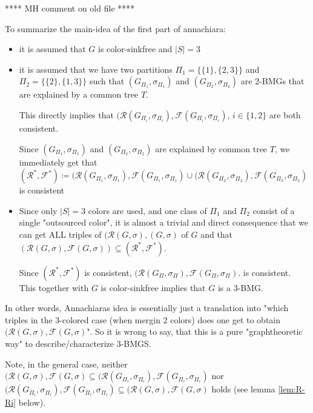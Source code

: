 \documentclass[final,3p,times]{elsarticle}
\newcommand{\TODO}[1]{\begingroup\color{red}#1\endgroup}
\begin{document}
\TODO{ \begin{center}**** MH comment on old file **** \end{center} 
 To summarize the main-idea of the first part of annachiara: 
 \begin{itemize}[nolistsep, noitemsep]
 	\item it is assumed that $G$ is color-sinkfree and $|S|=3$
 	\item it is assumed that we have two partitions $\Pi_1 = \{\{1\},\{2,3\}\}$ and $\Pi_2=
		 \{\{2\},\{1,3\}\}$ such that 		 
		 $(G_{\Pi_1},\sigma_{\Pi_1})$ and $(G_{\Pi_2},\sigma_{\Pi_2})$ are 2-BMGs that
		 are explained by a common tree $T$. \smallskip
		 
		 This directly implies that
		 $(\mathscr{R}(G_{\Pi_i},\sigma_{\Pi_i}),\mathscr{F}(G_{\Pi_i},\sigma_{\Pi_i})$,
 		$i\in \{1,2\}$ are both consistent.		 \smallskip
 		
 		Since $(G_{\Pi_1},\sigma_{\Pi_1})$ and $(G_{\Pi_2},\sigma_{\Pi_2})$ are explained by common tree $T$, 
 		we immediately get that 
 		$(\mathscr{R}^*, \mathscr{F}^*) \coloneqq
 		  (\mathscr{R}(G_{\Pi_1},\sigma_{\Pi_1}),\mathscr{F}(G_{\Pi_1},\sigma_{\Pi_1})
 		  \cup (\mathscr{R}(G_{\Pi_2},\sigma_{\Pi_2}),\mathscr{F}(G_{\Pi_2},\sigma_{\Pi_2})$
 		  is consistent	
 	\item Since only $|S|=3$ colors are used, and one class of $\Pi_1$ and
 	      $\Pi_2$ consist of a single "outsourced color", it is almost a trivial
 	      and direct consequence that we can get ALL triples of
 	      $(\mathscr{R}(G,\sigma),(G,\sigma)$ of $G$ and that
 	      $(\mathscr{R}(G,\sigma),\mathscr{F}(G,\sigma)) \subseteq
 	      (\mathscr{R}^*, \mathscr{F}^*)$. 
 	      
  	      Since $(\mathscr{R}^*, \mathscr{F}^*)$ is consistent, 
 	      $(\mathscr{R}(G_{\Pi},\sigma_{\Pi}),\mathscr{F}(G_{\Pi},\sigma_{\Pi})$.
 	      is consistent. This together with $G$ is color-sinkfree implies that
 	      $G$ is a 3-BMG.  
  	  
 \end{itemize}
 
 \smallskip
 \noindent
  In other words, Annachiaras idea is essentially just a translation
 into "which triples in the 3-colored case (when mergin 2 colors) 
 does one get to obtain $(\mathscr{R}(G,\sigma),\mathscr{F}(G,\sigma)$". 
 So it is wrong to say, that this is a pure "graphtheoretic way"
 to describe/characterize 3-BMGS. \smallskip
 
 Note, in the general case, neither $(\mathscr{R}(G,\sigma),\mathscr{F}(G,\sigma)
 \subseteq (\mathscr{R}(G_{\Pi_i},\sigma_{\Pi_i}),\mathscr{F}(G_{\Pi_i},\sigma_{\Pi_i})$
 nor $ (\mathscr{R}(G_{\Pi_i},\sigma_{\Pi_i}),\mathscr{F}(G_{\Pi_i},\sigma_{\Pi_i})
 \subseteq (\mathscr{R}(G,\sigma),\mathscr{F}(G,\sigma)$
 holds (see lemma \ref{lem:R-Ri} below).\smallskip 
 
}
\end{document}
